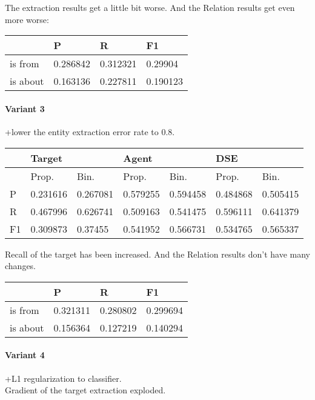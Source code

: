 \documentclass[a4paper, 12pt]{article}
\begin{document}
The extraction results get a little bit worse.
And the Relation results get even more worse:
\begin{table}[h!]
\centering
\begin{tabular}{l|l|l|l}
\hline
         & P & R & F1    \\\hline
is from  & 0.286842& 0.312321&  0.29904 \\
is about & 0.163136& 0.227811& 0.190123 \\
\hline
\end{tabular}
\end{table}

\paragraph{Variant 3}
+lower the entity extraction error rate to $0.8$.

\begin{table}[h!]
\centering
\begin{tabular}{l|ll|ll|ll}
\hline
   & \multicolumn{2}{l}{Target} & \multicolumn{2}{l}{Agent} & \multicolumn{2}{l}{DSE} \\ \hline
   & Prop.& Bin.& Prop.& Bin.& Prop.& Bin.\\
 \hline
P  &0.231616&0.267081 &0.579255 & 0.594458 &0.484868 & 0.505415 \\
R  &0.467996&0.626741 &0.509163 & 0.541475 &0.596111 & 0.641379 \\
F1 &0.309873& 0.37455 &0.541952 & 0.566731 &0.534765 & 0.565337 \\ \hline
\end{tabular}
\end{table}

Recall of the target has been increased.
And the Relation results don't have many changes.
\begin{table}[h!]
\centering
\begin{tabular}{l|l|l|l}
\hline
         & P & R & F1    \\\hline
is from  & 0.321311& 0.280802& 0.299694 \\
is about & 0.156364& 0.127219& 0.140294 \\
\hline
\end{tabular}
\end{table}

\paragraph{Variant 4}
+L1 regularization to classifier.\\
Gradient of the target extraction exploded.\\
\end{document}
